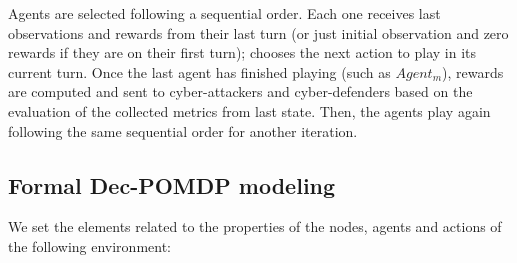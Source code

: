 \documentclass[conference]{IEEEtran}
\begin{document}
\noindent
Agents are selected following a sequential order. Each one receives last observations and rewards from their last turn (or just initial observation and zero rewards if they are on their first turn); chooses the next action to play in its current turn. Once the last agent has finished playing (such as $Agent_m$), rewards are computed and sent to cyber-attackers and cyber-defenders based on the evaluation of the collected metrics from last state. Then, the agents play again following the same sequential order for another iteration.


\subsection{Formal Dec-POMDP modeling}

We set the elements related to the properties of the nodes, agents and actions of the following environment:
\end{document}
